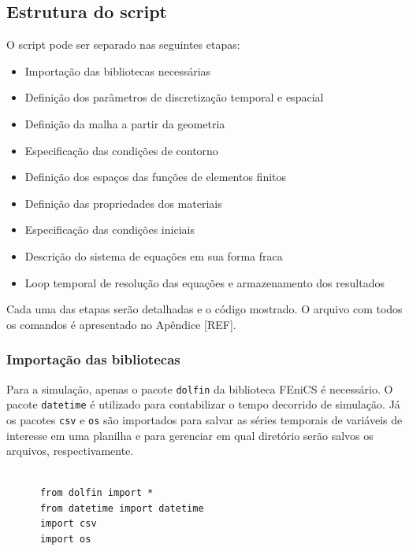    \subsection{Estrutura do script}\label{mat:script}
    O script pode ser separado nas seguintes etapas:

    \begin{itemize}
    \item Importação das bibliotecas necessárias
    \item Definição dos parâmetros de discretização temporal e espacial
    \item Definição da malha a partir da geometria
    \item Especificação das condições de contorno
    \item Definição dos espaços das funções de elementos finitos
    \item Definição das propriedades dos materiais
    \item Especificação das condições iniciais
    \item Descrição do sistema de equações em sua forma fraca
    \item Loop temporal de resolução das equações e armazenamento dos resultados 
    \end{itemize}

    Cada uma das etapas serão detalhadas e o código mostrado. O arquivo com
    todos os comandos é apresentado no Apêndice [REF].

    
    \subsubsection{Importação das bibliotecas}
    Para a simulação, apenas o pacote \texttt{dolfin} da biblioteca
    FEniCS é necessário. O pacote \texttt{datetime} é utilizado para
    contabilizar o tempo decorrido de simulação. Já os pacotes
    \texttt{csv} e \texttt{os} são importados para
    salvar as séries temporais de variáveis de interesse em uma planilha e para 
    gerenciar em qual diretório serão salvos os arquivos, respectivamente.

    \begin{verbatim}

      from dolfin import *
      from datetime import datetime
      import csv
      import os
    \end{verbatim}
   
